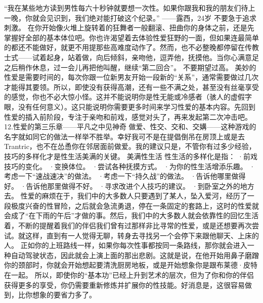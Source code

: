 \documentclass[12pt,UTF8,openany]{ctexbook}
\begin{document}
“我在某些地方读到男性每六十秒钟就要想一次性。如果你跟我和我的朋友们待上一晚，你就会见识到，我们绝对能打破这个纪录。”
——露西，24岁
不要急于追求刺激。
在你开始像火堆上旋转着的狂舞者一般翻滚、扭曲你的身体之前，还是先掌握好全部的基本体位吧。你也许渴望着去体验性爱狂野的一面，但如果连最简单的都还不能做好，就更不用提那些高难度动作了。然而，也不必整晚都停留在传教士式——试着起身，站着做，向后倾斜，亲吻他，逗弄他，抚摸他。当你心满意足之后稍作休息，过一会儿再把他叫醒，继续“第二回合”。
不要期望过高。
美妙的性爱是需要时间的，每次你跟一位新男友开始一段新的“关系”，通常需要做过几次才能得其要领。所以，即使没有获得高潮，还有一些不满之处，甚至没有丝毫享受的感觉，你也不必大惊小怪。这并不能说明你是性无能或冷感者（骇人的虚假字眼，没有任何意义）。这只能说明你需要更多时间来学习性爱的基本内容。先回到性爱的插入前阶段，专注于亲吻和前戏，感觉对头了，再来发起第二次冲击吧。
12.性爱的第三乐章——平凡之中见神奇
做爱、性交、交和、交媾——这种游戏的名字就如同它的做法一样举不胜举。幸好我可不是在提倡倒吊在房顶上或是去Trantric，也不在怂恿你在邻居面前做爱。我的建议只是，不管你有过多少经验，技巧的多样化才是性生活美满的关键。
美满性生活
性生活的多样化是指：
·前戏技巧的变化。
·变换体位。
·尝试各种抚摸方式。
·为你的性生活增添乐趣。
·考虑一下“速战速决”的做法。
·考虑一下“持久战”的做法。
·告诉他哪里做得好。
·告诉他那里做得不好。
·寻求改进个人技巧的建议。
·到卧室之外的地方去。
性爱的麻烦在于，我们中的大多数人只要遇到了某人，坠入爱河，经历了一段极度兴奋的性冒险，之后就会急流勇退，停在一条固定的套路上，这时的性爱就会成了“在下雨的午后”才做的事。然后，我们中的大多数人就会依靠性的回忆生活着，不断的提醒着我们的伴侣我们曾有过那样非比寻常的性爱，或是还想要再次尝试。就这样，直到有一人觉得无聊，转身去寻找另一个会停下来跟他聊天、上床的人。
正如你的上班路线一样，如果你每次性事都按同一条路线，那你就会进入一种自动驾驶状态，因此就会上演上面的那出悲剧。这就是说，在他开始用鼻子磨蹭你的颈部时，你就会开始想起要清洗厨房地板，或是开始想象你是跟布莱德·皮特在一起。
所以，即使你的“基本功”已经上升到艺术的层次，但为了你和你的伴侣获得更多的享受，你仍需要重新修炼并扩展你的性技能。好消息是，这很容易做到，比你想象的要省力多了。
\end{document}
